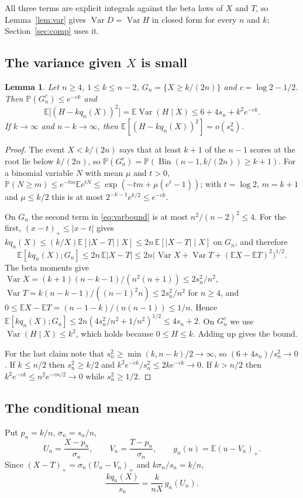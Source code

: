 \documentclass[11pt]{amsart}
\newtheorem{lemma}[theorem]{Lemma}
\theoremstyle{remark}
\numberwithin{equation}{section}
\newcommand{\E}{\mathbb E}
\newcommand{\Pp}{\mathbb P}
\newcommand{\1}{\mathbf 1}
\newcommand{\Var}{\operatorname{Var}}
\newcommand{\Bin}{\operatorname{Bin}}
\begin{document}
All three terms are explicit integrals against the beta laws of $X$ and $T$, so Lemma~\ref{lem:var} gives $\Var D=\Var H$ in closed form for every $n$ and $k$; Section~\ref{sec:comp} uses it.

\subsection{The variance given \texorpdfstring{$X$}{X} is small}

\begin{lemma}\label{lem:small}
Let $n\ge4$, $1\le k\le n-2$, $G_n=\{X\ge k/(2n)\}$ and $c=\log2-1/2$. Then $\Pp(G_n^c)\le e^{-ck}$ and
\[
\E\bigl[(H-kq_n(X))^2\bigr]=\E\Var(H\mid X)\le6+4s_n+k^2e^{-ck}.
\]
If $k\to\infty$ and $n-k\to\infty$, then $\E[(H-kq_n(X))^2]=o(s_n^2)$.
\end{lemma}

\begin{proof}
The event $X<k/(2n)$ says that at least $k+1$ of the $n-1$ scores at the root lie below $k/(2n)$, so $\Pp(G_n^c)=\Pp(\Bin(n-1,k/(2n))\ge k+1)$. For a binomial variable $N$ with mean $\mu$ and $t>0$, $\Pp(N\ge m)\le e^{-tm}\E e^{tN}\le\exp(-tm+\mu(e^t-1))$; with $t=\log2$, $m=k+1$ and $\mu\le k/2$ this is at most $2^{-k-1}e^{k/2}\le e^{-ck}$.

On $G_n$ the second term in \eqref{eq:varbound} is at most $n^2/(n-2)^2\le4$. For the first, $(x-t)_+\le|x-t|$ gives $kq_n(X)\le(k/X)\E[|X-T|\mid X]\le2n\,\E[|X-T|\mid X]$ on $G_n$, and therefore
\[
\E[kq_n(X);G_n]\le2n\,\E|X-T|\le2n\bigl(\Var X+\Var T+(\E X-\E T)^2\bigr)^{1/2}.
\]
The beta moments give $\Var X=(k+1)(n-k-1)/(n^2(n+1))\le2s_n^2/n^2$, $\Var T=k(n-k-1)/((n-1)^2n)\le2s_n^2/n^2$ for $n\ge4$, and $0\le\E X-\E T=(n-1-k)/(n(n-1))\le1/n$. Hence $\E[kq_n(X);G_n]\le2n(4s_n^2/n^2+1/n^2)^{1/2}\le4s_n+2$. On $G_n^c$ we use $\Var(H\mid X)\le k^2$, which holds because $0\le H\le k$. Adding up gives the bound.

For the last claim note that $s_n^2\ge\min(k,n-k)/2\to\infty$, so $(6+4s_n)/s_n^2\to0$. If $k\le n/2$ then $s_n^2\ge k/2$ and $k^2e^{-ck}/s_n^2\le2ke^{-ck}\to0$. If $k>n/2$ then $k^2e^{-ck}\le n^2e^{-cn/2}\to0$ while $s_n^2\ge1/2$.
\end{proof}

\subsection{The conditional mean}

Put $p_n=k/n$, $\sigma_n=s_n/n$,
\[
U_n=\frac{X-p_n}{\sigma_n},\qquad V_n=\frac{T-p_n}{\sigma_n},\qquad g_n(u)=\E(u-V_n)_+.
\]
Since $(X-T)_+=\sigma_n(U_n-V_n)_+$ and $k\sigma_n/s_n=k/n$,
\begin{equation}\label{eq:rescale}
\frac{kq_n(X)}{s_n}=\frac{k}{nX}\,g_n(U_n).
\end{equation}
\end{document}
